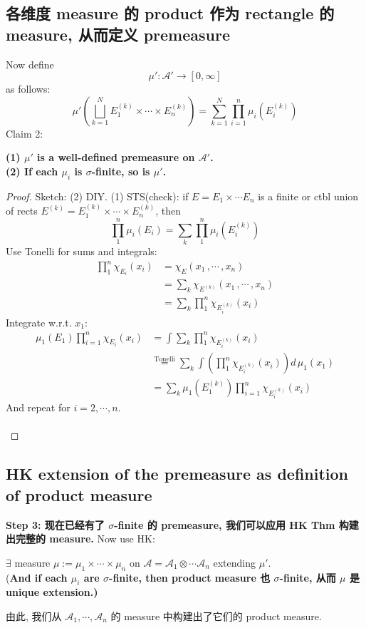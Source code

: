 \documentclass[lang=cn,11pt]{elegantbook}
\begin{document}
\subsection{各维度 measure 的 product 作为 rectangle 的 measure, 从而定义 premeasure}
Now define $$\mu' : \mathcal{A}' \rightarrow [0,\infty]$$ as follows: $$ \mu'(\bigsqcup_{k=1}^N E_1^{(k)} \times \cdots \times E_n^{(k)}) = \sum_{k=1}^N \prod_{i=1}^n \mu_i (E_i^{(k)}) $$
Claim 2:
\begin{proposition}
   \textbf{ (1) $\mu'$ is a well-defined premeasure on $\mathcal{A}'$.\\
    (2) If each $\mu_i$ is $\sigma$-finite, so is $\mu'$.}   
\end{proposition}
\begin{proof}
 Sketch: (2) DIY.
    (1) STS(check): if $E = E_1 \times \cdots E_n$ is a finite or ctbl union of rects $E^{(k)} = E_1^{(k)}\times \cdots \times E_n^{(k)} $, then $$\prod_1^n  \mu_i(E_i) = \sum_k \prod_1^n \mu_i(E_i^{(k)})  $$
 Use Tonelli for sums and integrals: \begin{align}
        \prod_1^n \chi_{E_i} (x_i) &= \chi_E (x_1\,, \cdots \,,x_n) \\
        &= \sum_k \chi_{E^{(k)}} (x_1 \,, \cdots \,, x_n) \\
        &= \sum_k \prod_1^n \chi_{E_i^{(k)}} (x_i)
    \end{align}
Integrate w.r.t. $x_1$: 
\begin{align}
\mu_1(E_1) \prod_{i=1}^n \chi_{E_i} (x_i)& = \int \sum_k \prod_1^n \chi_{E_i ^{(k)}} (x_i)    \\
&\overset{\text{Tonelli}}{=}  \sum_k  \int (\prod_1^n   \chi_{E_i ^{(k)}} (x_i) )  d \, \mu_1 (x_1) \\
& = \sum_k \mu_1(E_1^{(k)}) \prod_{i=1}^n \chi_{E_i^{(k)}} (x_i)
\end{align}
And repeat for $i=2,\cdots,n$.\\\\
    
\end{proof}

\subsection{HK extension of the premeasure as definition of product measure}
\textbf{Step 3: 现在已经有了 $\sigma$-finite 的 premeasure, 我们可以应用 HK Thm 构建出完整的 measure.}
Now use HK:
\begin{corollary}
    $\exists$ measure $\mu := \mu_1 \times \cdots \times \mu_n$ on $\mathcal{A} = \mathcal{A}_1 \otimes \cdots \mathcal{A}_n$ extending $\mu'$.\\
    (\textbf{And if each $\mu_i $ are $\sigma$-finite, then product measure 也 $\sigma$-finite, 从而 $\mu$ 是 unique extension.)}
\end{corollary}
由此, 我们从 $\mathcal{A}_1 , \cdots ,\mathcal{A}_n$ 的 measure 中构建出了它们的 product measure.\\\\
\end{document}
